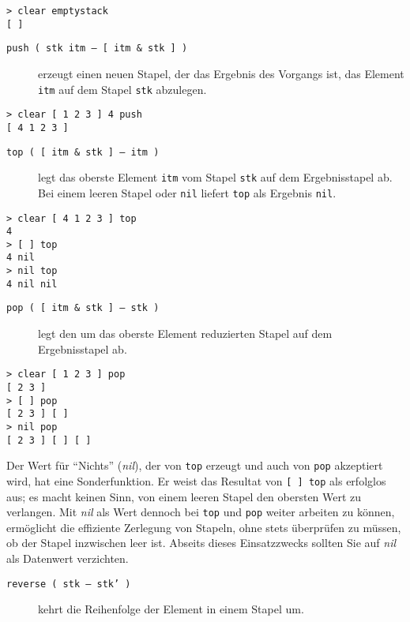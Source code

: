 \begin{verbatim}
> clear emptystack
[ ]
\end{verbatim}

\begin{description}
\item[\texttt{push ( stk itm -- [ itm \& stk ] )}] erzeugt einen neuen Stapel, der das Ergebnis des Vorgangs ist, das Element \verb|itm| auf dem Stapel \verb|stk| abzulegen.
\end{description}

\begin{verbatim}
> clear [ 1 2 3 ] 4 push
[ 4 1 2 3 ]
\end{verbatim}

\begin{description}
\item[\texttt{top ( [ itm \& stk ] -- itm )}] legt das oberste Element \verb|itm| vom Stapel \verb|stk| auf dem Ergebnisstapel ab. Bei einem leeren Stapel oder \verb|nil| liefert \verb|top| als Ergebnis \verb|nil|. 
\end{description}

\begin{verbatim}
> clear [ 4 1 2 3 ] top
4
> [ ] top
4 nil
> nil top
4 nil nil
\end{verbatim}

\begin{description}
\item[\texttt{pop ( [ itm \& stk ] -- stk )}] legt den um das oberste Element reduzierten Stapel auf dem Ergebnisstapel ab.
\end{description}

\begin{verbatim}
> clear [ 1 2 3 ] pop
[ 2 3 ]
> [ ] pop
[ 2 3 ] [ ]
> nil pop
[ 2 3 ] [ ] [ ]
\end{verbatim}

Der Wert für "`Nichts"' (\emph{nil}), der von \verb|top| erzeugt und auch von \verb|pop| akzeptiert wird, hat eine Sonderfunktion. Er weist das Resultat von \verb|[ ] top| als erfolglos aus; es macht keinen Sinn, von einem leeren Stapel den obersten Wert zu verlangen. Mit \emph{nil} als Wert dennoch bei \verb|top| und \verb|pop| weiter arbeiten zu können, ermöglicht die effiziente Zerlegung von Stapeln, ohne stets überprüfen zu müssen, ob der Stapel inzwischen leer ist. Abseits dieses Einsatzzwecks sollten Sie auf \emph{nil} als Datenwert verzichten.

\begin{description}
\item[\texttt{reverse ( stk -- stk' )}] kehrt die Reihenfolge der Element in einem Stapel um.
\end{description}

